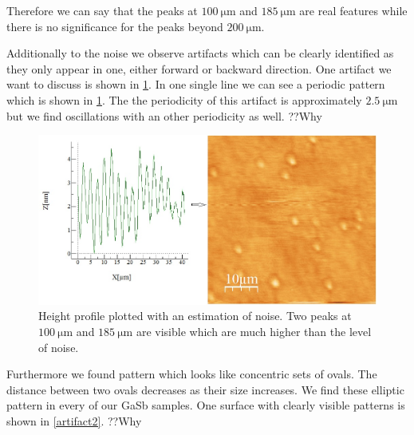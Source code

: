 \documentclass[paper=a4,fontsize=10pt,DIV=18,twocolumn,parskip=half]{scrartcl}
\numberwithin{equation}{section}    %
\begin{document}
Therefore we can say that the peaks at $\SI{100}{\micro\meter}$ and 
$\SI{185}{\micro\meter}$ are real features while there is no significance for 
the peaks beyond $\SI{200}{\micro\meter}$.

Additionally to the noise we observe artifacts which can be clearly identified as they only appear in one, either forward or backward direction. One artifact we want to discuss is shown in \cref{artifact1}. In one single line we can see a periodic pattern which is shown in \ref{artifact1}. The the periodicity of this artifact is approximately $\SI{2.5}{\micro\meter}$ but we find oscillations with an other periodicity as well. ??Why\\
\begin{figure}[htp]
	\begin{center}
		\includegraphics[width=\columnwidth]{Bilder/artifact1}
		\caption{Height profile plotted with an estimation of noise. Two peaks at $\SI{100}{\micro\meter}$ and $\SI{185}{\micro\meter}$ are visible which are much higher than the level of noise. }
		\label{artifact1}
	\end{center}
\end{figure}

Furthermore we found pattern which looks like concentric sets of ovals. The distance between two ovals decreases as their size increases. We find these elliptic pattern in every of our GaSb samples. One surface with clearly visible patterns is shown in \ref{artifact2}. ??Why
\end{document}
